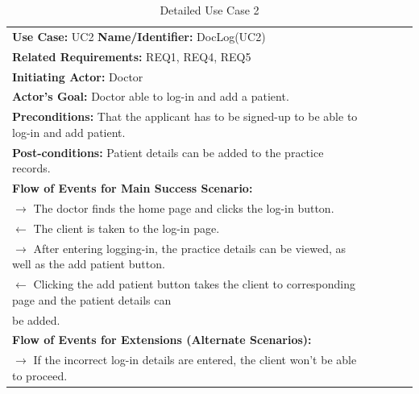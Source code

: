 \documentclass[a4paper]{article}
\begin{document}
\begin{table}[h!]
\centering
\caption*{Detailed Use Case 2}
\label{DetailedUC2}
\begin{tabular}{|c|llll}
\cline{1-1}

\multicolumn{1}{|l|}{\textbf{Use Case:} UC2 \textbf{Name/Identifier:} DocLog(UC2)} &  &  &  &  \\ \cline{1-1}

\multicolumn{1}{|l|}{\textbf{Related Requirements:} REQ1, REQ4, REQ5} &  &  &  &  \\

\multicolumn{1}{|l|}{\textbf{Initiating Actor:} Doctor} &  &  &  &  \\

\multicolumn{1}{|l|}{\textbf{Actor’s Goal:} Doctor able to log-in and add a patient.} &  &  &  &  \\

\multicolumn{1}{|l|}{\textbf{Preconditions:} That the applicant has to be signed-up to be able to log-in and add patient.} &  &  &  &  \\

\multicolumn{1}{|l|}{\textbf{Post-conditions:} Patient details can be added to the practice records.} &  &  &  &  \\

\multicolumn{1}{|l|}{\textbf{Flow of Events for Main Success Scenario:}} &  &  &  &  \\

\multicolumn{1}{|l|}{ $ \rightarrow $ The doctor finds the home page and clicks the log-in button.} &  &  &  &  \\

\multicolumn{1}{|l|}{ $ \leftarrow $ The client is taken to the log-in page.} &  &  &  &  \\

\multicolumn{1}{|l|}{ $ \rightarrow $ After entering logging-in, the practice details can be viewed, as well as the add patient button.} &  &  &  &  \\

\multicolumn{1}{|l|}{ $ \leftarrow $ Clicking the add patient button takes the client to corresponding page and the patient details can } &  &  &  &  \\

\multicolumn{1}{|l|}{be added.} &  &  &  &  \\

\multicolumn{1}{|l|}{\textbf{Flow of Events for Extensions (Alternate Scenarios):}} &  &  &  &  \\

\multicolumn{1}{|l|}{ $ \rightarrow $ If the incorrect log-in details are entered, the client won't be able to proceed.} &  &  &  &  \\ \cline{1-1}

\end{tabular}
\end{table}
\end{document}
